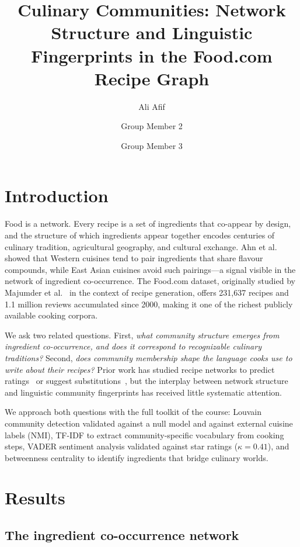 \documentclass[9pt,twocolumn]{pnas-new}
\title{Culinary Communities: Network Structure and Linguistic Fingerprints in the Food.com Recipe Graph}
\author[a,1]{Ali Afif}
\author[a]{Group Member 2}
\author[a]{Group Member 3}
\affil[a]{Technical University of Denmark, DTU Compute, Kongens Lyngby, Denmark}
\begin{document}
\maketitle
\thispagestyle{firststyle}

\section*{Introduction}

Food is a network. Every recipe is a set of ingredients that co-appear by design, and the structure of which ingredients appear together encodes centuries of culinary tradition, agricultural geography, and cultural exchange. Ahn et al.~\cite{ahn2011flavor} showed that Western cuisines tend to pair ingredients that share flavour compounds, while East Asian cuisines avoid such pairings---a signal visible in the network of ingredient co-occurrence. The Food.com dataset, originally studied by Majumder et al.~\cite{majumder2019generating} in the context of recipe generation, offers 231,637 recipes and 1.1 million reviews accumulated since 2000, making it one of the richest publicly available cooking corpora.

We ask two related questions. First, \textit{what community structure emerges from ingredient co-occurrence, and does it correspond to recognizable culinary traditions?} Second, \textit{does community membership shape the language cooks use to write about their recipes?} Prior work has studied recipe networks to predict ratings~\cite{teng2012recipe} or suggest substitutions~\cite{shirai2021recipe}, but the interplay between network structure and linguistic community fingerprints has received little systematic attention.

We approach both questions with the full toolkit of the course: Louvain community detection validated against a null model and against external cuisine labels (NMI), TF-IDF to extract community-specific vocabulary from cooking steps, VADER sentiment analysis validated against star ratings ($\kappa = 0.41$), and betweenness centrality to identify ingredients that bridge culinary worlds.

\section*{Results}

\subsection*{The ingredient co-occurrence network}
\end{document}
